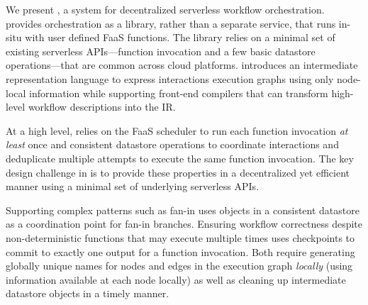 We present \name{}, a system for decentralized serverless workflow
orchestration. \name{} provides orchestration as a library, rather than a
separate service, that runs in-situ with user defined FaaS functions. The
library relies on a minimal set of existing serverless APIs---function
invocation and a few basic datastore operations---that are common across cloud
platforms. \name{} introduces an intermediate representation language to express
interactions execution graphs using only node-local information while supporting
front-end compilers that can transform high-level workflow descriptions
into the IR.

At a high level, \name{} relies on the FaaS scheduler to run each function
invocation \emph{at least} once and consistent datastore operations to
coordinate interactions and deduplicate multiple attempts to execute the same
function invocation. The key design challenge in \name{} is to provide these
properties in a decentralized yet efficient manner using a minimal set of
underlying serverless APIs.

Supporting complex patterns such as fan-in uses objects in a consistent
datastore as a coordination point for fan-in branches. Ensuring workflow
correctness despite non-deterministic functions that may execute multiple times
uses checkpoints to commit to exactly one output for a function invocation. Both
require generating globally unique names for nodes and edges in the execution
graph \emph{locally} (using information available at each node locally) as well
as cleaning up intermediate datastore objects in a timely manner.

